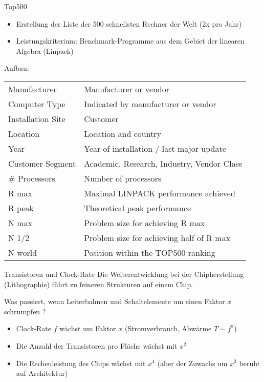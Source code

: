 \begin{bonus}{Top500}
    \begin{itemize}
        \item Erstellung der Liste der 500 schnellsten Rechner der Welt (2x pro Jahr)
        \item Leistungskriterium: Benchmark-Programme aus dem Gebiet der linearen Algebra (Linpack)
    \end{itemize}
    Aufbau:
    \begin{tabular}{|l|l|}
        Manufacturer      & Manufacturer or vendor                     \\
        Computer Type     & Indicated by manufacturer or vendor        \\
        Installation Site & Customer                                   \\
        Location          & Location and country                       \\
        Year              & Year of installation / last major update   \\
        Customer Segment  & Academic, Research, Industry, Vendor Class \\
        \# Processors     & Number of processors                       \\
        R max             & Maximal LINPACK performance achieved       \\
        R peak            & Theoretical peak performance               \\
        N max             & Problem size for achieving R max           \\
        N 1/2             & Problem size for achieving half of R max   \\
        N world           & Position within the TOP500 ranking         \\
    \end{tabular}
\end{bonus}

\begin{bonus}{Transistoren und Clock-Rate}
    Die Weiterentwicklung bei der Chipherstellung (Lithographie) führt zu feineren Strukturen auf einem Chip.

    Was passiert, wenn Leiterbahnen und Schaltelemente um einen Faktor $x$ schrumpfen ?
    \begin{itemize}
        \item Clock-Rate $f$ wächst um Faktor $x$ (Stromverbrauch, Abwärme $T \sim f^2$)
        \item Die Anzahl der Transistoren pro Fläche wächst mit $x^2$
        \item Die Rechenleistung des Chips wächst mit $x^4$ (aber der Zuwachs um $x^3$ beruht auf Architektur)
    \end{itemize}
\end{bonus}

